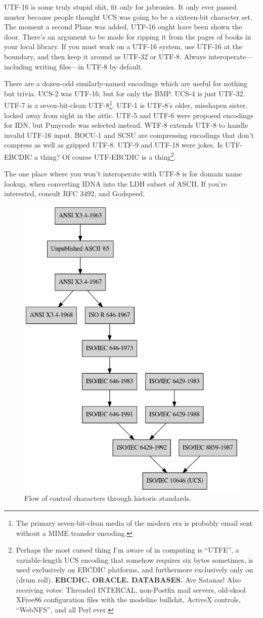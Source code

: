 UTF-16 is some truly stupid shit, fit only for jabronies. It only ever passed
muster because people thought UCS was going to be a sixteen-bit character set.
The moment a second Plane was added, UTF-16 ought have been shown the door.
There's an argument to be made for ripping it from the pages of books
in your local library. If you must work on a UTF-16
system, use UTF-16 at the boundary, and then keep it around as UTF-32 or UTF-8.
Always interoperate---including writing files---in UTF-8 by default.

There are a dozen-odd similarly-named encodings which are useful for nothing
but trivia. UCS-2 was UTF-16, but for only the BMP. UCS-4 is just UTF-32. UTF-7
is a seven-bit-clean UTF-8\footnote{The primary seven-bit-clean media of the
modern era is probably email sent without a MIME transfer encoding.}. UTF-1 is UTF-8's older, misshapen sister, locked away from
sight in the attic. UTF-5 and UTF-6 were proposed encodings for IDN, but
Punycode was selected instead. WTF-8 extends UTF-8 to handle invalid UTF-16
input. BOCU-1 and SCSU are compressing encodings that
don't compress as well as gzipped UTF-8. UTF-9 and UTF-18 were jokes. Is
UTF-EBCDIC a thing? Of course UTF-EBCDIC is a thing\footnote{Perhaps the
most cursed thing I'm aware of in computing is
``UTFE'', a variable-length UCS encoding that somehow requires six bytes
sometimes, is used exclusively on EBCDIC platforms, and furthermore exclusively
only on (drum roll)\textellipsis. \textbf{EBCDIC. ORACLE. DATABASES.} Ave Satanas! Also receiving
votes: Threaded INTERCAL, non-Postfix mail servers, old-skool XFree86 configuration
files with the modeline bullshit, ActiveX controls, ``WebNFS'', and all Perl ever.}.

The one place where you won't interoperate with UTF-8 is for domain name lookup,
when converting IDNA into the LDH subset of ASCII. If you're interested,
consult RFC 3492, and Godspeed.

\begin{figure}[!htb]
    \centering
    \includegraphics[width=.75\linewidth]{media/control-char-standards.png}
    \caption{Flow of control characters through historic standards.}
\end{figure}

\cleardoublepage
